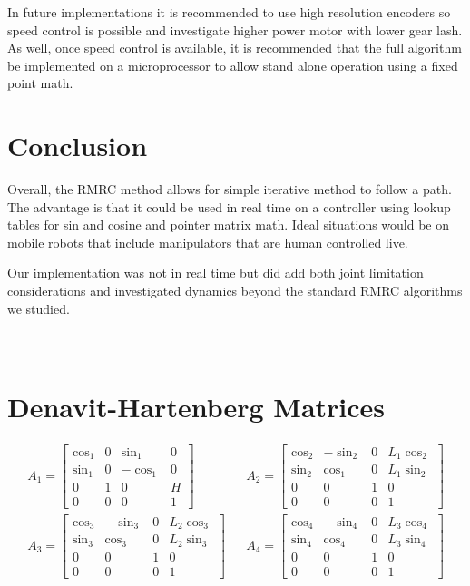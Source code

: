 \documentclass[paper=letter, fontsize=10pt]{scrartcl}	%
\numberwithin{equation}{section}															%
\numberwithin{figure}{section}																%
\numberwithin{table}{section}																%
\begin{document}
In future implementations it is recommended to use high resolution encoders so speed control is possible and investigate higher power motor with lower gear lash. As well, once speed control is available, it is recommended that the full algorithm be implemented on a microprocessor to allow stand alone operation using a fixed point math. 

\section{Conclusion}

Overall, the RMRC method allows for simple iterative method to follow a path. The advantage is that it could be used in real time on a controller using lookup tables for sin and cosine and pointer matrix math. Ideal situations would be on mobile robots that include manipulators that are human controlled live.

Our implementation was not in real time but did add both joint limitation considerations and investigated dynamics beyond the standard RMRC algorithms we studied. 



\newpage
\appendix
\section{\\Denavit-Hartenberg Matrices} \label{App:AppendixA}
\begin{align} 
	A_1 = 
	\begin{bmatrix}
	\cos_1 	& 0  & \sin_1 	& 0 \\
  	\sin_1 	& 0  & -\cos_1 	& 0 \\
  	0		& 1  & 0 		& H \\
  	0		& 0  & 0 		& 1 
	\end{bmatrix} &&
	A_2 = 
	\begin{bmatrix}
	\cos_2 	& -\sin_2  & 0 	& L_1\cos_2 \\
  	\sin_2 	& \cos_1  & 0 	& L_1\sin_2 \\
  	0		& 0  & 1 		& 0 \\
  	0		& 0  & 0 		& 1 
	\end{bmatrix}\\
	A_3 = 
	\begin{bmatrix}
	\cos_3 	& -\sin_3  & 0 	& L_2\cos_3 \\
  	\sin_3 	& \cos_3  & 0 	& L_2\sin_3 \\
  	0		& 0  & 1 		& 0 \\
  	0		& 0  & 0 		& 1 
	\end{bmatrix} && 
	A_4 = 
	\begin{bmatrix}
	\cos_4 	& -\sin_4  & 0 	& L_3\cos_4 \\
  	\sin_4 	& \cos_4  & 0 	& L_3\sin_4 \\
  	0		& 0  & 1 		& 0 \\
  	0		& 0  & 0 		& 1 
	\end{bmatrix}
\end{align}
\end{document}
